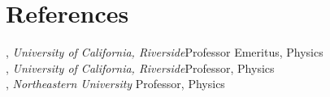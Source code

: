 \documentclass[letter,10pt]{article}
\begin{document}
%

\section{References}
, \textit{University of California, Riverside}\hfill Professor Emeritus, Physics\\
, \textit{University of California, Riverside}\hfill Professor, Physics\\
, \textit{Northeastern University} \hfill Professor, Physics\\
\end{document}

